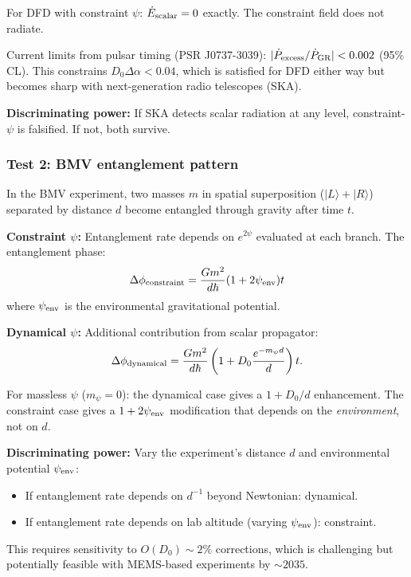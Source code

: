 \documentclass[11pt,a4paper]{article}
\begin{document}
For DFD with constraint $\psi$: $\dot{E}_{\rm scalar} = 0$ exactly. The constraint field does not radiate.

Current limits from pulsar timing (PSR J0737-3039): $|\dot{P}_{\rm excess}/\dot{P}_{\rm GR}| < 0.002$ (95\% CL). This constrains $D_0 \Delta\alpha < 0.04$, which is satisfied for DFD either way but becomes sharp with next-generation radio telescopes (SKA).

\textbf{Discriminating power:} If SKA detects scalar radiation at any level, constraint-$\psi$ is falsified. If not, both survive.

\subsubsection{Test 2: BMV entanglement pattern}

In the BMV experiment, two masses $m$ in spatial superposition ($|L\rangle + |R\rangle$) separated by distance $d$ become entangled through gravity after time $t$.

\textbf{Constraint $\psi$:} Entanglement rate depends on $e^{2\psi}$ evaluated at each branch. The entanglement phase:
\begin{equation}
\Delta\phi_{\rm constraint} = \frac{Gm^2}{d\hbar}(1 + 2\psi_{\rm env})t
\end{equation}
where $\psi_{\rm env}$ is the environmental gravitational potential.

\textbf{Dynamical $\psi$:} Additional contribution from scalar propagator:
\begin{equation}
\Delta\phi_{\rm dynamical} = \frac{Gm^2}{d\hbar}\left(1 + D_0\frac{e^{-m_\psi d}}{d}\right)t.
\end{equation}

For massless $\psi$ ($m_\psi = 0$): the dynamical case gives a $1+D_0/d$ enhancement. The constraint case gives a $1+2\psi_{\rm env}$ modification that depends on the \emph{environment}, not on $d$.

\textbf{Discriminating power:} Vary the experiment's distance $d$ and environmental potential $\psi_{\rm env}$:
\begin{itemize}
\item If entanglement rate depends on $d^{-1}$ beyond Newtonian: dynamical.
\item If entanglement rate depends on lab altitude (varying $\psi_{\rm env}$): constraint.
\end{itemize}

This requires sensitivity to $O(D_0) \sim 2\%$ corrections, which is challenging but potentially feasible with MEMS-based experiments by $\sim 2035$.
\end{document}
